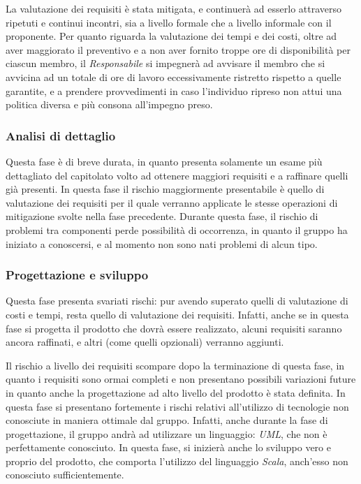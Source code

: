\documentclass[a4paper]{article}
\begin{document}
				La valutazione dei requisiti è stata mitigata, e continuerà ad esserlo attraverso ripetuti e continui incontri, sia a livello formale 
				che a livello informale con il proponente. Per quanto riguarda la valutazione dei tempi e dei costi, oltre ad aver maggiorato il 
				preventivo e a non aver fornito troppe ore di disponibilità per ciascun membro, il \emph{Responsabile} si impegnerà ad avvisare il 
				membro che si avvicina ad un totale di ore di lavoro eccessivamente ristretto rispetto a quelle garantite, e a prendere provvedimenti 
				in caso l'individuo ripreso non attui una politica diversa e più consona all'impegno preso.
				
			\subsubsection{Analisi di dettaglio}
				Questa fase è di breve durata, in quanto presenta solamente un esame più dettagliato del capitolato volto ad ottenere maggiori requisiti 
				e a raffinare quelli già presenti.
				In questa fase il rischio maggiormente presentabile è quello di valutazione dei requisiti per il quale verranno applicate le stesse 
				operazioni di mitigazione svolte nella fase precedente. Durante questa fase, il rischio di problemi tra componenti perde possibilità di 
				occorrenza, in quanto il gruppo ha iniziato a conoscersi, e al momento non sono nati problemi di alcun tipo. 
				
			\subsubsection{Progettazione e sviluppo}
				Questa fase presenta svariati rischi: pur avendo superato quelli di valutazione di costi e tempi, resta quello di valutazione dei 
				requisiti. Infatti, anche se in questa fase si progetta il prodotto che dovrà essere realizzato, alcuni requisiti saranno ancora 
				raffinati, e altri (come quelli opzionali) verranno aggiunti.
				
				Il rischio a livello dei requisiti scompare dopo la terminazione di questa fase, in quanto i requisiti sono ormai completi e non 
				presentano possibili variazioni future in quanto anche la progettazione ad alto livello del prodotto è stata definita.
				In questa fase si presentano fortemente i rischi relativi all'utilizzo di tecnologie non conosciute in maniera ottimale dal gruppo. 
				Infatti, anche durante la fase di progettazione, il gruppo andrà ad utilizzare un linguaggio: \emph{UML}, che non è perfettamente 
				conosciuto. In questa fase, si inizierà anche lo sviluppo vero e proprio del prodotto, che comporta l'utilizzo del linguaggio 
				\emph{Scala}, anch'esso non conosciuto sufficientemente.
				
\end{document}
